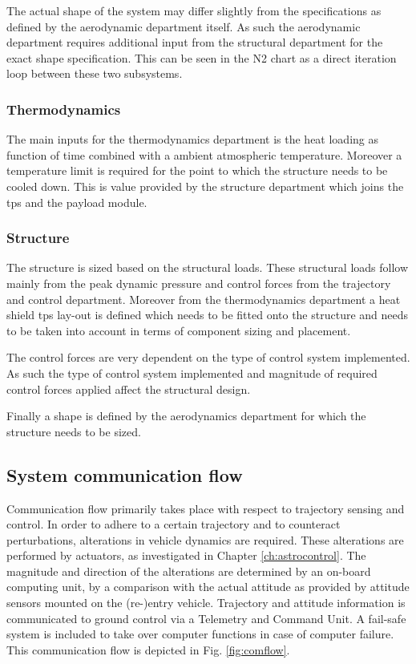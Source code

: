 The actual shape of the system may differ slightly from the specifications as defined by the aerodynamic department itself. As such the aerodynamic department requires additional input from the structural department for the exact shape specification. This can be seen in the N2 chart as a direct iteration loop between these two subsystems.

\subsubsection{Thermodynamics}
The main inputs for the thermodynamics department is the heat loading as function of time combined with a ambient atmospheric temperature. Moreover a temperature limit is required for the point to which the structure needs to be cooled down. This is value provided by the structure department which joins the \gls{tps} and the payload module.

\subsubsection{Structure}

The structure is sized based on the structural loads. These structural loads follow mainly from the peak dynamic pressure and control forces from the trajectory and control department. Moreover from the thermodynamics department a heat shield \gls{tps} lay-out is defined which needs to be fitted onto the structure and needs to be taken into account in terms of component sizing and placement.

The control forces are very dependent on the type of control system implemented. As such the type of control system implemented and magnitude of required control forces applied affect the structural design.

Finally a shape is defined by the aerodynamics department for which the structure needs to be sized. 

\subsection{System communication flow} \label{sec:comflow}
Communication flow primarily takes place with respect to trajectory sensing and control. In order to adhere to a certain trajectory and to counteract perturbations, alterations in vehicle dynamics are required. These alterations are performed by actuators, as investigated in Chapter \ref{ch:astrocontrol}. The magnitude and direction of the alterations are determined by an on-board computing unit, by a comparison with the actual attitude as provided by attitude sensors mounted on the (re-)entry vehicle. Trajectory and attitude information is communicated to ground control via a Telemetry and Command Unit. A fail-safe system is included to take over computer functions in case of computer failure. This communication flow is depicted in Fig. \ref{fig:comflow}.

